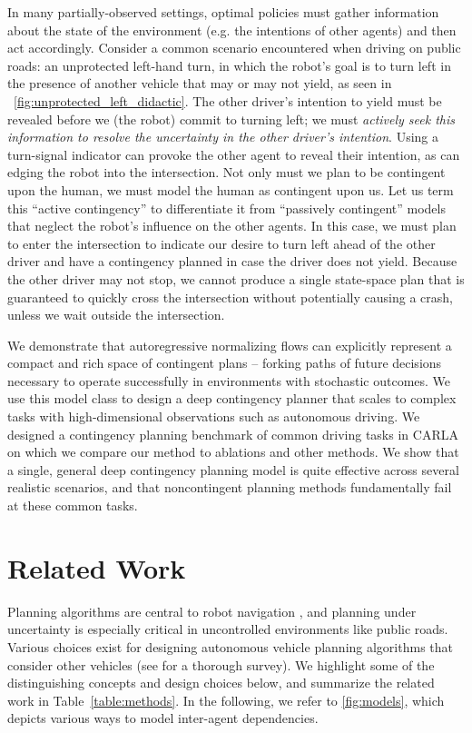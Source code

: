 \documentclass[conference]{IEEEtran}
\begin{document}
In many partially-observed settings, optimal policies must gather information about the state of the environment (e.g. the intentions of other agents) and then act accordingly.
Consider a common scenario encountered when driving on public roads: an unprotected left-hand turn, in which the robot's goal is to turn left in the presence of another vehicle that may or may not yield, as seen in ~\cref{fig:unprotected_left_didactic}. The other driver's intention to yield must be revealed before we (the robot) commit to turning left; we must \emph{actively seek this information to resolve the uncertainty in the other driver’s intention}. Using a turn-signal indicator can provoke the other agent to reveal their intention, as can edging the robot into the intersection. Not only must we plan to be contingent upon the human, we must model the human as contingent upon us. 
Let us term this ``active contingency'' to differentiate it from ``passively contingent'' models that neglect the robot's influence on the other agents. 
In this case, we must plan to enter the intersection to indicate our desire to turn left ahead of the other driver and have a contingency planned in case the driver does not yield. 
Because the other driver may not stop, we cannot produce a single state-space plan that is guaranteed to quickly cross the intersection without potentially causing a crash, unless we wait outside the intersection. 
 
We demonstrate that autoregressive normalizing flows can explicitly represent a compact and rich space of contingent plans -- forking paths of future decisions necessary to operate successfully in environments with stochastic outcomes. We use this model class to design a deep contingency planner that scales to complex tasks with high-dimensional observations such as autonomous driving. We designed a contingency planning benchmark of common driving tasks in CARLA on which we compare our method to ablations and other methods. We show that a single, general deep contingency planning model is quite effective across several realistic scenarios, and that noncontingent planning methods fundamentally fail at these common tasks.

\vspace{-.35em}
\section{Related Work} \label{sec:related-work}
\vspace{-.25em}


Planning algorithms are central to robot navigation \citep{lavalle2006planning}, and planning under uncertainty is especially critical in uncontrolled environments like public roads.
Various choices exist for designing autonomous vehicle planning algorithms that consider other vehicles (see \citet{schwarting2018planning} for a thorough survey). We highlight some of the distinguishing concepts and design choices below, and summarize the related work in Table~\ref{table:methods}. 
In the following, we refer to \cref{fig:models}, which depicts various ways to model inter-agent dependencies. 
\end{document}
